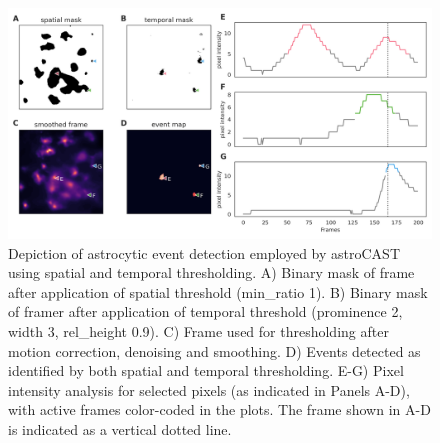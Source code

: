 \begin{figure}[!htb]
\begin{center}
\includegraphics[width=\linewidth]{figures/5.png}
\end{center}
\caption{
Depiction of astrocytic event detection employed by astroCAST using spatial and temporal thresholding. A) Binary mask of frame after application of spatial threshold (min\_ratio 1). B) Binary mask of framer after application of temporal threshold (prominence 2, width 3, rel\_height 0.9). C) Frame used for thresholding after motion correction, denoising and smoothing. D) Events detected as identified by both spatial and temporal thresholding. E-G) Pixel intensity analysis for selected pixels (as indicated in Panels A-D), with active frames color-coded in the plots. The frame shown in A-D is indicated as a vertical dotted line.
}\label{fig:5}
\end{figure}

